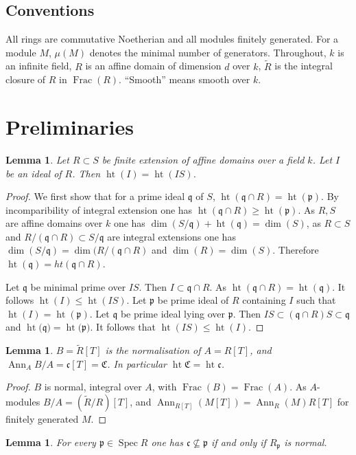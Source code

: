 \documentclass[11pt,reqno]{amsart}
\theoremstyle{plain}
\newtheorem{lemma}[theorem]{Lemma}
\theoremstyle{definition}
\newcommand{\Spec}{\operatorname{Spec}}
\newcommand{\hgt}{\operatorname{ht}}
\newcommand{\Ann}{\operatorname{Ann}}
\newcommand{\Frac}{\operatorname{Frac}}
\newcommand{\Rt}{\widetilde{R}}
\newcommand{\cc}{\mathfrak{c}}
\newcommand{\CC}{\mathfrak{C}}
\newcommand{\pp}{\mathfrak{p}}
\begin{document}
\subsection*{Conventions}
All rings are commutative Noetherian and all modules finitely generated. For a module $M$,
$\mu(M)$ denotes the minimal number of generators. Throughout, $k$ is an infinite field, $R$
is an affine domain of dimension $d$ over $k$, $\Rt$ is the integral closure of $R$ in $\Frac(R)$.  ``Smooth'' means smooth over $k$.

\section{Preliminaries}


  \begin{lemma}\label{lem:height}
    Let $R\subset S$ be finite extension of affine domains over a field $k$. Let $I$ be an ideal of $R$. Then $\hgt(I)=\hgt(IS)$. 
\end{lemma}
\begin{proof}
    We first show that for a prime ideal $\mathfrak{q}$ of $S$, $\hgt(\mathfrak{q}\cap R)=\hgt(\mathfrak{p})$. By incomparibility of integral extension one has $\hgt(\mathfrak{q}\cap R)\geq \hgt(\mathfrak{p})$. As $R,S$ are affine domains over $k$ one has $\dim(S/\mathfrak{q})+\hgt(\mathfrak{q})=\dim(S)$, as $R\subset S$ and $R/(\mathfrak{q}\cap R)\subset  S/\mathfrak{q}$ are integral extensions one has $\dim(S/\mathfrak{q})=\dim(R/(\mathfrak{q}\cap R)$ and $\dim(R)=\dim(S)$. Therefore $\hgt(\mathfrak{q})=ht(\mathfrak{q}\cap R)$.

    Let $\mathfrak{q}$ be minimal prime over $IS$. Then $I\subset \mathfrak{q}\cap R$. As $\hgt(\mathfrak{q}\cap R)=\hgt(\mathfrak{q})$. It follows $\hgt(I)\leq \hgt(IS)$. Let $\mathfrak{p}$ be prime ideal of $R$ containing $I$ such that $\hgt(I)=\hgt(\mathfrak{p})$. Let $\mathfrak{q}$ be prime ideal lying over $\mathfrak{p}$. Then $IS\subset (\mathfrak{q}\cap R)S\subset \mathfrak{q}$ and $\hgt(\mathfrak{q)}=\hgt(\mathfrak{p)}$. It follows that $\hgt(IS)\leq \hgt(I).$ 
   \end{proof}  
   \begin{lemma}\label{lem:square}
$B=\Rt[T]$ is the normalisation of $A=R[T]$, and $\Ann_A B/A=\cc[T]=\CC$. In particular
$\hgt\CC=\hgt\cc$.
\end{lemma}

\begin{proof}
$B$ is normal, integral over $A$, with $\Frac(B)=\Frac(A)$. As $A$-modules $B/A=(\Rt/R)[T]$,
and $\Ann_{R[T]}(M[T])=\Ann_R(M)R[T]$ for finitely generated $M$.
\end{proof}
\begin{lemma}\label{lem:loc}
For every $\pp\in\Spec R$ one has $\cc\not\subseteq\pp$ if and only if $R_\pp$ is normal.
\end{lemma}
\end{document}
